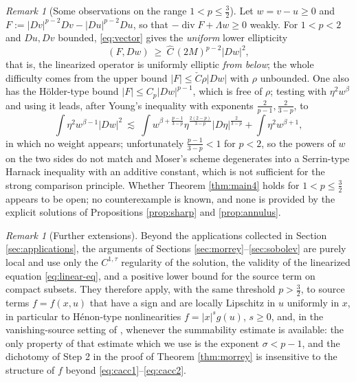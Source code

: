 \documentclass[reqno]{amsart}
\theoremstyle{plain}
\theoremstyle{definition}
\theoremstyle{remark}
\newtheorem{remark}[theorem]{Remark}
\begin{document}
\begin{remark}[Some observations on the range $1<p\le\frac32$]
Let $w=v-u\ge0$ and $F:=|Dv|^{p-2}Dv-|Du|^{p-2}Du$, so that $-\operatorname{div}F+\Lambda w\ge0$
weakly. For $1<p<2$ and $Du,Dv$ bounded, \eqref{eq:vector} gives the \emph{uniform} lower ellipticity
\[
(F,Dw)\ \ge\ \hat C\,(2M)^{p-2}|Dw|^2 ,
\]
that is, the linearized operator is uniformly elliptic \emph{from below}; the whole difficulty comes
from the upper bound $|F|\le\check C\rho|Dw|$ with $\rho$ unbounded. One also has the H\"older-type
bound $|F|\le C_p|Dw|^{p-1}$, which is free of $\rho$; testing with $\eta^2w^{\beta}$ and using it
leads, after Young's inequality with exponents $\frac{2}{p-1},\frac{2}{3-p}$, to
\[
\int\eta^2w^{\beta-1}|Dw|^2\ \lesssim\ \int w^{\beta+\frac{p-1}{3-p}}\eta^{\frac{2(2-p)}{3-p}}|D\eta|^{\frac{2}{3-p}}
+\int\eta^2w^{\beta+1},
\]
in which no weight appears; unfortunately $\frac{p-1}{3-p}<1$ for $p<2$, so the powers of $w$ on the
two sides do not match and Moser's scheme degenerates into a Serrin-type Harnack inequality with an
additive constant, which is not sufficient for the strong comparison principle. Whether Theorem
\ref{thm:main4} holds for $1<p\le\frac32$ appears to be open; no counterexample is known, and none is
provided by the explicit solutions of Propositions \ref{prop:sharp} and \ref{prop:annulus}.
\end{remark}

\begin{remark}[Further extensions]
Beyond the applications collected in Section \ref{sec:applications}, the arguments of Sections
\ref{sec:morrey}--\ref{sec:sobolev} are purely local and use only the $C^{1,\tau}$ regularity of the
solution, the validity of the linearized equation \eqref{eq:linear-eq}, and a positive lower bound
for the source term on compact subsets. They therefore apply, with the same threshold
$p>\frac32$, to source terms $f=f(x,u)$ that have a sign and are locally Lipschitz in $u$
uniformly in $x$, in particular to H\'enon-type nonlinearities $f=|x|^{s}g(u)$, $s\ge0$, and,
in the vanishing-source setting of \cite{Sci2}, whenever the summability estimate
\cite[Theorem 3.1]{Sci2} is available: the only property of that estimate which we use is the
exponent $\sigma<p-1$, and the dichotomy of Step 2 in the proof of Theorem \ref{thm:morrey} is
insensitive to the structure of $f$ beyond \eqref{eq:cacc1}--\eqref{eq:cacc2}.
\end{remark}

\end{document}
